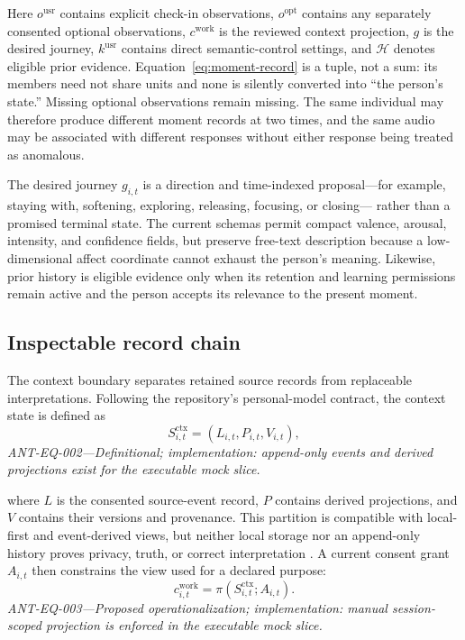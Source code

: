 Here $o^{\mathrm{usr}}$ contains explicit check-in observations,
$o^{\mathrm{opt}}$ contains any separately consented optional observations,
$c^{\mathrm{work}}$ is the reviewed context projection, $g$ is the desired
journey, $k^{\mathrm{usr}}$ contains direct semantic-control settings, and
$\mathcal{H}$ denotes eligible prior evidence. Equation~\ref{eq:moment-record}
is a tuple, not a sum: its members need not share units and none is silently
converted into ``the person's state.'' Missing optional observations remain
missing. The same individual may therefore produce different moment records
at two times, and the same audio may be associated with different responses
without either response being treated as anomalous.

The desired journey $g_{i,t}$ is a direction and time-indexed proposal---for
example, staying with, softening, exploring, releasing, focusing, or closing---
rather than a promised terminal state. The current schemas permit compact
valence, arousal, intensity, and confidence fields, but preserve free-text
description because a low-dimensional affect coordinate cannot exhaust the
person's meaning. Likewise, prior history is eligible evidence only when its
retention and learning permissions remain active and the person accepts its
relevance to the present moment.

\subsection{Inspectable record chain}
\label{sec:design-record-chain}

The context boundary separates retained source records from replaceable
interpretations. Following the repository's personal-model contract, the
context state is defined as
\begin{equation}
  S^{\mathrm{ctx}}_{i,t} =
  \left(L_{i,t}, P_{i,t}, V_{i,t}\right),
  \label{eq:context-store}
\end{equation}
\noindent\textit{ANT-EQ-002---Definitional; implementation: append-only events
and derived projections exist for the executable mock slice.}

where $L$ is the consented source-event record, $P$ contains derived
projections, and $V$ contains their versions and provenance. This partition is
compatible with local-first and event-derived views, but neither local storage
nor an append-only history proves privacy, truth, or correct interpretation
\citep{kleppmann2019localfirst,lin2026scroll}. A current consent grant
$A_{i,t}$ then constrains the view used for a declared purpose:
\begin{equation}
  c^{\mathrm{work}}_{i,t}
  = \pi\!\left(S^{\mathrm{ctx}}_{i,t}; A_{i,t}\right).
  \label{eq:working-projection}
\end{equation}
\noindent\textit{ANT-EQ-003---Proposed operationalization; implementation:
manual session-scoped projection is enforced in the executable mock slice.}

